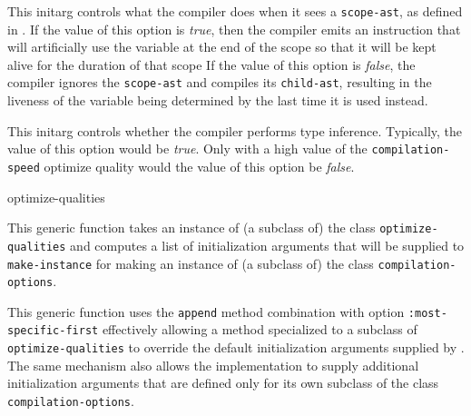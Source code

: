 
This initarg controls what the compiler does when it sees a
\texttt{scope-ast}, as defined in .  If the
value of this option is \emph{true}, then the compiler emits
an instruction that will artificially use the variable at the end of
the scope so that it will be kept alive for the duration of that scope
If the value of this option is \emph{false}, the compiler ignores the
\texttt{scope-ast} and compiles its \texttt{child-ast}, resulting in
the liveness of the variable being determined by the last time it is
used instead.


This initarg controls whether the compiler performs type inference.
Typically, the value of this option would be \emph{true}.  Only with a
high value of the \texttt{compilation-speed} optimize quality would
the value of this option be \emph{false}.

 {optimize-qualities}

This generic function takes an instance of (a subclass of) the class
\texttt{optimize-qualities} and computes a list of initialization
arguments that will be supplied to \texttt{make-instance} for making
an instance of (a subclass of) the class \texttt{compilation-options}.

This generic function uses the \texttt{append} method combination with
option \texttt{:most-specific-first} effectively allowing a method
specialized to a subclass of \texttt{optimize-qualities} to override
the default initialization arguments supplied by \sysname{}.  The same
mechanism also allows the implementation to supply additional
initialization arguments that are defined only for its own subclass of
the class \texttt{compilation-options}.
